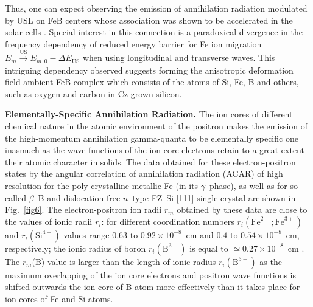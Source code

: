 \documentclass{ttp}
\begin{document}
Thus, one can expect observing the emission of annihilation radiation modulated by USL on FeB centers
whose association was shown to be accelerated in the solar cells \cite{Olikh2022:JMatSci}.
Special interest in this connection is a paradoxical divergence in the frequency dependency of reduced
energy barrier for Fe ion migration $E_m \xrightarrow{\mathrm{US}} E_{m,0}-\Delta E_\mathrm{US}$
when using longitudinal and transverse waves.
This intriguing dependency observed suggests forming the anisotropic deformation field ambient FeB complex
which consists of the atoms of Si, Fe, B and others, such as oxygen and carbon in Cz-grown silicon.


\noindent \textbf{Elementally-Specific Annihilation Radiation.}
The ion cores of different chemical nature in the atomic environment of the positron
makes the emission of the high-momentum annihilation gamma-quanta to be elementally specific one inasmuch
as the wave functions of the ion core electrons retain to a great extent their atomic character in solids.
The data obtained for these electron-positron states by the angular correlation of annihilation radiation (ACAR)
of high resolution for the poly-crystalline metallic Fe (in its $\gamma$--phase),
as well as for so-called $\beta$--B and dislocation-free $n$–type FZ–Si [111] single crystal are shown in Fig.~\ref{fig6}.
The electron-positron ion radii $r_m$ obtained by these data are close to the values of ionic radii $r_i$:
for different coordination numbers $r_i(\mathrm{Fe}^{2+}; \mathrm{Fe}^{3+})$ and $r_i(\mathrm{Si}^{4+})$ values
range 0.63 to $0.92\times10^{−8}$~cm and $0.4$ to $0.54\times10^{−8}$~cm, respectively;
the ionic radius of boron $r_i(\mathrm{B}^{3+})$ is equal to $\simeq0.27\times10^{−8}$~cm \cite{Suchet1965,Rahm2016}.
The $r_m$(B) value is larger than the length of ionic radius $r_i(\mathrm{B}^{3+})$ as the maximum overlapping of the ion core
 electrons and positron wave functions \cite{Ferrell1956} is shifted outwards the ion core of B atom more effectively than it takes place for ion cores of Fe and Si atoms.


\end{document}
